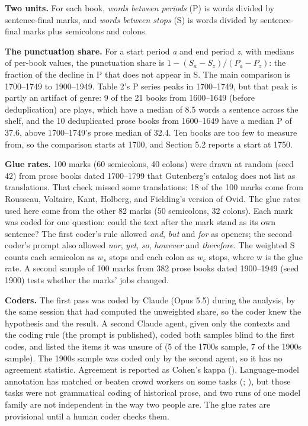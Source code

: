 \documentclass[
  11pt,
]{article}
\begin{document}
\textbf{Two units.} For each book, \emph{words between periods} (P) is words divided by sentence-final marks, and \emph{words between stops} (S) is words divided by sentence-final marks plus
semicolons and colons.

\textbf{The punctuation share.} For a start period \emph{a} and end period \emph{z}, with medians of per-book values, the punctuation share is \(1 - (S_a - S_z)/(P_a - P_z)\): the fraction of the
decline in P that does not appear in S. The main comparison is 1700--1749 to 1900--1949. Table 2's P series peaks in 1700--1749, but that peak is partly an artifact of genre: 9 of the 21 books from
1600--1649 (before deduplication) are plays, which have a median of 8.5 words a sentence across the shelf, and the 10 deduplicated prose books from 1600--1649 have a median P of 37.6, above
1700--1749's prose median of 32.4. Ten books are too few to measure from, so the comparison starts at 1700, and Section 5.2 reports a start at 1750.

\textbf{Glue rates.} 100 marks (60 semicolons, 40 colons) were drawn at random (seed 42) from prose books dated 1700--1799 that Gutenberg's catalog does not list as translations. That check missed
some translations: 18 of the 100 marks come from Rousseau, Voltaire, Kant, Holberg, and Fielding's version of Ovid. The glue rates used here come from the other 82 marks (50 semicolons, 32 colons).
Each mark was coded for one question: could the text after the mark stand as its own sentence? The first coder's rule allowed \emph{and}, \emph{but} and \emph{for} as openers; the second coder's
prompt also allowed \emph{nor}, \emph{yet}, \emph{so}, \emph{however} and \emph{therefore}. The weighted S counts each semicolon as \(w_s\) stops and each colon as \(w_c\) stops, where w is the glue
rate. A second sample of 100 marks from 382 prose books dated 1900--1949 (seed 1900) tests whether the marks' jobs changed.

\textbf{Coders.} The first pass was coded by Claude (Opus 5.5) during the analysis, by the same session that had computed the unweighted share, so the coder knew the hypothesis and the result. A
second Claude agent, given only the contexts and the coding rule (the prompt is published), coded both samples blind to the first codes, and listed the items it was unsure of (5 of the 1700s sample, 7
of the 1900s sample). The 1900s sample was coded only by the second agent, so it has no agreement statistic. Agreement is reported as Cohen's kappa ().
Language-model annotation has matched or beaten crowd workers on some tasks (; ), but those tasks were not
grammatical coding of historical prose, and two runs of one model family are not independent in the way two people are. The glue rates are provisional until a human coder checks them.
\end{document}
